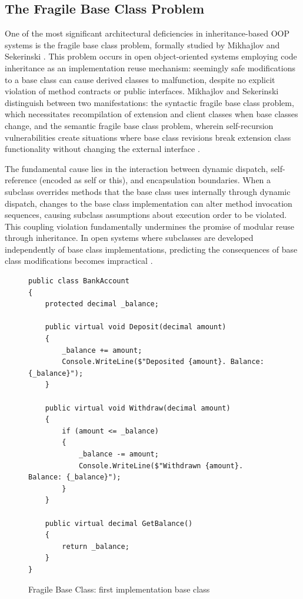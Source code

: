 \subsection{The Fragile Base Class Problem}

One of the most significant architectural deficiencies in inheritance-based OOP systems is the fragile base class problem, formally studied by Mikhajlov and Sekerinski \cite{mikhajlov1998study}. This problem occurs in open object-oriented systems employing code inheritance as an implementation reuse mechanism: seemingly safe modifications to a base class can cause derived classes to malfunction, despite no explicit violation of method contracts or public interfaces. Mikhajlov and Sekerinski distinguish between two manifestations: the syntactic fragile base class problem, which necessitates recompilation of extension and client classes when base classes change, and the semantic fragile base class problem, wherein self-recursion vulnerabilities create situations where base class revisions break extension class functionality without changing the external interface \cite{mikhajlov1998study}.

The fundamental cause lies in the interaction between dynamic dispatch, self-reference (encoded as self or this), and encapsulation boundaries. When a subclass overrides methods that the base class uses internally through dynamic dispatch, changes to the base class implementation can alter method invocation sequences, causing subclass assumptions about execution order to be violated. This coupling violation fundamentally undermines the promise of modular reuse through inheritance. In open systems where subclasses are developed independently of base class implementations, predicting the consequences of base class modifications becomes impractical \cite{mikhajlov1998study}.

\begin{figure}
    \centering
    \begin{verbatim}
public class BankAccount
{
    protected decimal _balance;
    
    public virtual void Deposit(decimal amount)
    {
        _balance += amount;
        Console.WriteLine($"Deposited {amount}. Balance: {_balance}");
    }
    
    public virtual void Withdraw(decimal amount)
    {
        if (amount <= _balance)
        {
            _balance -= amount;
            Console.WriteLine($"Withdrawn {amount}. Balance: {_balance}");
        }
    }
    
    public virtual decimal GetBalance()
    {
        return _balance;
    }
}
    \end{verbatim}
    \caption{Fragile Base Class: first implementation base class}
    \label{fig:fragile-base-class-first-implementation-base-class}
\end{figure}

